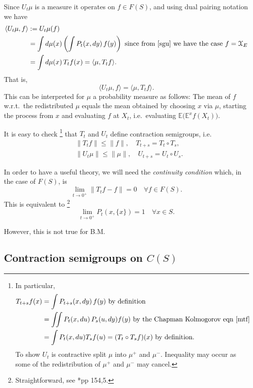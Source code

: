 \documentclass[a4paper]{amsart}
\theoremstyle{plain}
\theoremstyle{definition}
\theoremstyle{remark}
\begin{document}
Since $  U_t\mu $ is a measure it operates on $ f\in F (S) $, and using dual pairing notation we have
\begin{align*}
\langle U_t\mu  , f \rangle &:= U_t\mu(f) \\
   & =    \int  d\mu(x) \left( \int P_t(x,dy)\, f(y) \right)  \text{ since from \eqref{sgu} we have the case $ f = \mathcal{X}_E$}\\
   &= \int d\mu(x)\, T_t f(x) = \langle \mu, T_t f\rangle .
\end{align*}                           
That is,
\begin{equation} \label{}
\langle U_t\mu  , f \rangle =  \langle \mu, T_t f\rangle .
\end{equation} 
This can be interpreted for $ \mu $ a probability measure as follows: The mean of $ f $ w.r.t.\ the redistributed $ \mu $ equals the mean obtained by choosing $ x $ via $ \mu $, starting the process from $ x $ and evaluating $ f $ at $ X_t $, i.e.\ evaluating $ \mathbb{E}  \big( \mathbb{E} ^x f(X_t) \big)$.

\medskip It is easy to check%
\footnote{In particular,
\begin{align*} 
T_{t+s}f(x) & = \int P_{t+s}(x, dy ) \, f(y)\text{ by definition}\\
& = \iint P_t(x,du)\, P_s(u,dy) f(y) \text{ by the Chapman Kolmogorov eqn \eqref{mtf}}\\
&= \int P_t(x,du) T_sf(u) = (T_t\circ T_s f)(x) \text{ by definition}.
\end{align*}
To show $ U_t $ is contractive split $ \mu $ into $ \mu^+ $ and $ \mu^-$.  Inequality may occur as some of the redistribution of $ \mu^+ $ and  $ \mu^- $ may cancel.
}
that $ T_t  $ and $ U_t $ define contraction semigroups, i.e.
\begin{align}
 &\|T_t f \| \leq \|f\|, \quad T_{t+s} = T_t \circ T_s, \\
 &\|U_t \mu \| \leq \|\mu\|, \quad U_{t+s} = U_t \circ U_s.
 \end{align} 
 
\bigskip
In order to have a useful theory, we will need the \emph{continuity condition} which, in the case of $ F(S) $, is 
\[
\lim_{t\to 0^+} \| T_t f - f \| = 0  \quad \forall f\in F(S).
\]
This is equivalent to%
\footnote{Straightforward, see \cite{Lam}*{pp 154,5}.}  
\[\lim_{t\to 0^+}  P_t(x, \{x\} ) = 1 \quad \forall x\in S .\]

However, this is not true for B.M.   


\subsection{Contraction semigroups  on $ C(S) $} \label{seccs}
\end{document}
